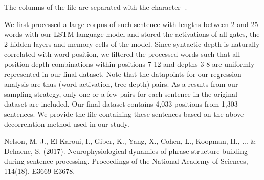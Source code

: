 \documentclass{article}
\begin{document}
\noindent The columns of the file are separated with the character $|$.

We first processed a large corpus of such sentence with lengths between 2 and 25 words with our LSTM language model and stored the activations of all gates, the 2 hidden layers and memory cells of the model. Since syntactic depth is naturally correlated with word position, we filtered the processed words such that all position-depth combinations within positions 7-12 and depths 3-8 are uniformly represented in our final dataset. Note that the datapoints for our regression analysis are thus (word activation, tree depth) pairs. As a results from our sampling strategy, only one or a few pairs for each sentence in the original dataset are included. Our final dataset contains 4,033 positions from 1,303 sentences. We provide the file containing these sentences based on the above decorrelation method used in our study.

\bigbreak

\noindent Nelson, M. J., El Karoui, I., Giber, K., Yang, X., Cohen, L., Koopman, H., ... \& Dehaene, S. (2017). Neurophysiological dynamics of phrase-structure building during sentence processing. Proceedings of the National Academy of Sciences, 114(18), E3669-E3678.
\end{document}
